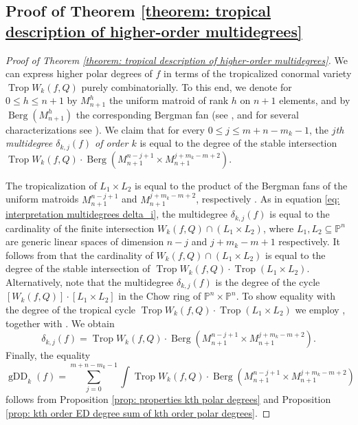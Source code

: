 \documentclass[11pt,reqno]{amsart}
\numberwithin{equation}{section}
\theoremstyle{plain}
\numberwithin{theorem}{section}
\theoremstyle{definition}
\renewcommand{\P}{\mathbb{P}}
\DeclareMathOperator{\Trop}{Trop}
\newcommand{\gDD}{\operatorname{gDD}}
\begin{document}
\subsection{Proof of Theorem \ref{theorem: tropical description of higher-order multidegrees}}\label{proof5}
\begin{proof}[Proof of Theorem \ref{theorem: tropical description of higher-order multidegrees}]
We can express higher polar degrees of $f$ in terms of the tropicalized conormal variety $\Trop W_k(f,Q)$ purely combinatorially.
To this end, we denote for $0\le h \le n+1$ by $M^h_{n+1}$ the uniform matroid of rank $h$ on $n+1$ elements, and by $\operatorname{Berg}(M^h_{n+1})$ the corresponding Bergman fan (see \cite[\S 4.2]{maclagan2015introduction}, and for several characterizations see \cite[Proposition 3.6]{Feichtner2005}).
We claim that for every $0\le j\le m+n-m_k-1$, the {\em $j$th multidegree $\delta_{k,j}(f)$ of order $k$} is equal to the degree of the stable intersection $\Trop W_k(f,Q) \cdot \operatorname{Berg}(M^{n-j+1}_{n+1}\times M^{j+m_k-m+2}_{n+1})$.

The tropicalization of $L_1 \times L_2$ is equal to the product of the Bergman fans of the uniform matroids $M^{n-j+1}_{n+1}$ and $M^{j+m_k-m+2}_{n+1}$, respectively \cite[Example 5.2.7]{maclagan2015introduction}.
As in equation \eqref{eq: interpretation multidegrees delta_i}, the multidegree
$\delta_{k,j}(f)$ is equal to the cardinality of the finite intersection $W_k(f,Q)\cap(L_1\times L_2)$, where $L_1, L_2 \subseteq \P^n$ are generic linear spaces of dimension
$n-j$ and $j+m_k-m+1$ respectively.
It follows from \cite[Theorem 5.3.3]{osserman2013lifting} that the cardinality of $W_k(f,Q)\cap(L_1\times L_2)$ is equal to the degree of the stable intersection of $\Trop W_k(f,Q) \cdot \Trop(L_1 \times L_2)$.
Alternatively, note that the multidegree $\delta_{k,j}(f)$ is the degree of the cycle $[W_k(f,Q)] \cdot [L_1\times L_2] $ in the Chow ring of $\P^n \times \P^n$. To show equality
with the degree of the tropical cycle $\Trop W_k(f,Q) \cdot \Trop(L_1 \times L_2)$ we employ
\cite[Theorem 3.1]{sturmfels1997intersection}, together with \cite[Theorem 4.4]{tropIntersTheory}. We obtain
\[\delta_{k,j}(f)=\Trop W_k(f,Q) \cdot \operatorname{Berg}(M^{n-j+1}_{n+1}\times M^{j+m_k-m+2}_{n+1}).\]  Finally, the equality 
\[
\gDD_k(f) = \sum_{j = 0}^{ m+n-m_k-1 }
\int \Trop W_k(f,Q) \cdot \operatorname{Berg}(M^{n-j+1}_{n+1}\times M^{j+m_k-m+2}_{n+1})
\]
follows from Proposition \ref{prop: properties kth polar degrees} and Proposition \ref{prop: kth order ED degree sum of kth order polar degrees}.
\end{proof}
\end{document}
